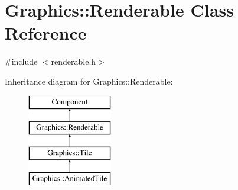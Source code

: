 \hypertarget{class_graphics_1_1_renderable}{}\section{Graphics\+:\+:Renderable Class Reference}
\label{class_graphics_1_1_renderable}


{\ttfamily \#include $<$renderable.\+h$>$}

Inheritance diagram for Graphics\+:\+:Renderable\+:\begin{figure}[H]
\begin{center}
\leavevmode
\includegraphics[height=4.000000cm]{class_graphics_1_1_renderable}
\end{center}
\end{figure}
